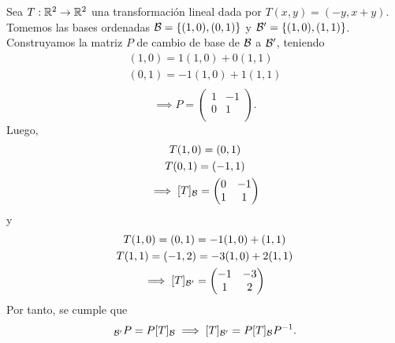 \documentclass[12pt,a4paper]{book}
\newcommand{\llaves}[1]{\{#1\}}
\begin{document}
    \vspace{1.2cm}

    \begin{ejemplo}
        Sea $T:\mathbb{R}^2 \to \mathbb{R}^2$ una transformación lineal dada por $T(x,y) = (-y, x + y)$. Tomemos las bases ordenadas $\BB = \llaves{(1,0), (0, 1)}$ y $\BB' = \llaves{(1, 0), (1, 1)}$.
        Construyamos la matriz $P$ de cambio de base de $\mathcal{B}$ a $\mathcal{B}'$, teniendo
        \begin{gather*}
            (1, 0) = 1(1,0) + 0(1, 1)\\
            (0, 1) = -1(1, 0) + 1(1, 1)\\
        \end{gather*}
        \begin{equation*}
            \implies P =
            \begin{pmatrix}
                1 & -1\\
                0 & 1\\
            \end{pmatrix}.
        \end{equation*}
        Luego,
        \begin{gather*}
            T(1,0) = (0,1)\\
            T(0,1) = (-1,1)\\
            \implies [T]_{\mathcal{B}} =
            \begin{pmatrix}
                0 & -1 \\
                1 & 1
            \end{pmatrix}
        \end{gather*}
        y
        \begin{gather*}
            T(1,0) = (0,1) = -1(1,0) + (1,1)\\
            T(1,1) = (-1, 2) = -3(1, 0) + 2(1, 1)\\
            \implies [T]_{\mathcal{B}'} =
            \begin{pmatrix}
                -1 & -3 \\
                1 & 2 \\
            \end{pmatrix}
        \end{gather*}
        Por tanto, se cumple que
        \begin{equation*}
            [T]_{\BB'}P = P[T]_{\BB} \implies [T]_{\BB'} = P[T]_{\BB}P^{-1}.
        \end{equation*}
    \end{ejemplo}
\end{document}
